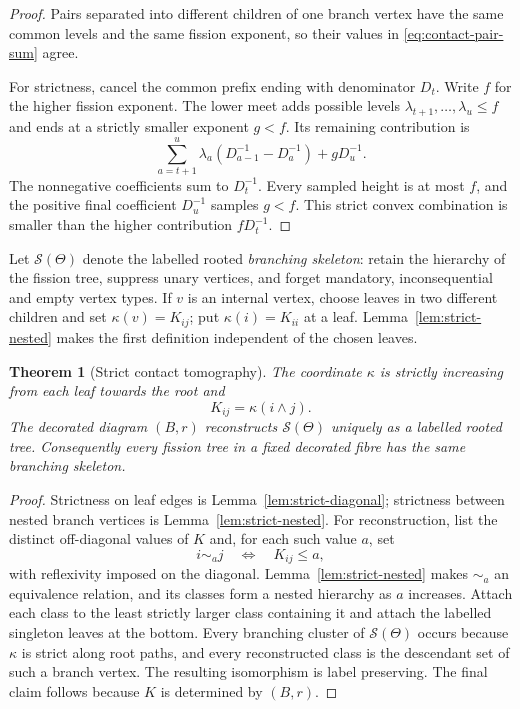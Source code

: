 \documentclass[11pt,a4paper]{amsart}
\theoremstyle{plain}
\newtheorem{theorem}{Theorem}[section]
\theoremstyle{definition}
\begin{document}
\begin{proof}
Pairs separated into different children of one branch vertex have the same common levels and the
same fission exponent, so their values in \eqref{eq:contact-pair-sum} agree.

For strictness, cancel the common prefix ending with denominator $D_t$.  Write $f$ for the higher
fission exponent.  The lower meet adds possible levels $\lambda_{t+1},\ldots,\lambda_u\le f$ and
ends at a strictly smaller exponent $g<f$.  Its remaining contribution is
\[
 \sum_{a=t+1}^u\lambda_a(D_{a-1}^{-1}-D_a^{-1})+gD_u^{-1}.
\]
The nonnegative coefficients sum to $D_t^{-1}$.  Every sampled height is at most $f$, and the
positive final coefficient $D_u^{-1}$ samples $g<f$.  This strict convex combination is smaller
than the higher contribution $fD_t^{-1}$.
\end{proof}

Let $\mathcal S(\Theta)$ denote the labelled rooted \emph{branching skeleton}: retain the hierarchy
of the fission tree, suppress unary vertices, and forget mandatory, inconsequential and empty
vertex types.  If $v$ is an internal vertex, choose leaves in two different children and set
$\kappa(v)=K_{ij}$; put $\kappa(i)=K_{ii}$ at a leaf.  Lemma~\ref{lem:strict-nested} makes the
first definition independent of the chosen leaves.

\begin{theorem}[Strict contact tomography]\label{thm:contact-tomography}
The coordinate $\kappa$ is strictly increasing from each leaf towards the root and
\[
 K_{ij}=\kappa(i\wedge j).
\]
The decorated diagram $(B,r)$ reconstructs $\mathcal S(\Theta)$ uniquely as a labelled rooted
tree.  Consequently every fission tree in a fixed decorated fibre has the same branching
skeleton.
\end{theorem}

\begin{proof}
Strictness on leaf edges is Lemma~\ref{lem:strict-diagonal}; strictness between nested branch
vertices is Lemma~\ref{lem:strict-nested}.  For reconstruction, list the distinct off-diagonal
values of $K$ and, for each such value $a$, set
\[
 i\sim_a j\quad\Longleftrightarrow\quad K_{ij}\le a,
\]
with reflexivity imposed on the diagonal.  Lemma~\ref{lem:strict-nested} makes $\sim_a$ an
equivalence relation, and its classes form a nested hierarchy as $a$ increases.  Attach each class
to the least strictly larger class containing it and attach the labelled singleton leaves at the
bottom.  Every branching cluster of $\mathcal S(\Theta)$ occurs because $\kappa$ is strict along
root paths, and every reconstructed class is the descendant set of such a branch vertex.  The
resulting isomorphism is label preserving.  The final claim follows because $K$ is determined by
$(B,r)$.
\end{proof}
\end{document}
